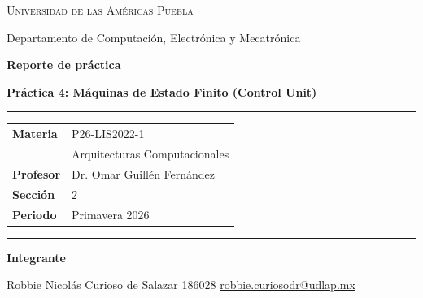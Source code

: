 \documentclass[12pt,letterpaper]{article}
\begin{document}
\begin{titlepage}
\thispagestyle{empty}
\begin{center}
\vspace*{0.8cm}

{\Large \textsc{Universidad de las Américas Puebla}}\par
{\small Departamento de Computación, Electrónica y Mecatrónica}\par

\vspace{1.2cm}

{\Huge \textbf{Reporte de práctica}}\par
\vspace{0.15cm}
{\Large \textbf{Práctica 4: Máquinas de Estado Finito (Control Unit)}}\par

\vspace{1.0cm}

\begin{minipage}{0.92\textwidth}
\rule{\textwidth}{0.8pt}\par
\vspace{0.35cm}

\begin{tabular}{@{}L{0.30\textwidth}L{0.62\textwidth}@{}}
\textbf{Materia} & P26-LIS2022-1\\
& Arquitecturas Computacionales\\
\textbf{Profesor} & Dr. Omar Guillén Fernández\\
\textbf{Sección} & 2\\
\textbf{Periodo} & Primavera 2026\\
\end{tabular}

\vspace{0.35cm}
\rule{\textwidth}{0.8pt}
\end{minipage}

\vfill

\begin{minipage}{0.92\textwidth}
\textbf{Integrante}\par
\vspace{0.25cm}
Robbie Nicolás Curioso de Salazar \hfill 186028 \hfill \href{mailto:robbie.curiosodr@udlap.mx}{robbie.curiosodr@udlap.mx}\par
\end{minipage}

\vspace{0.6cm}

\end{center}
\end{titlepage}
\end{document}
